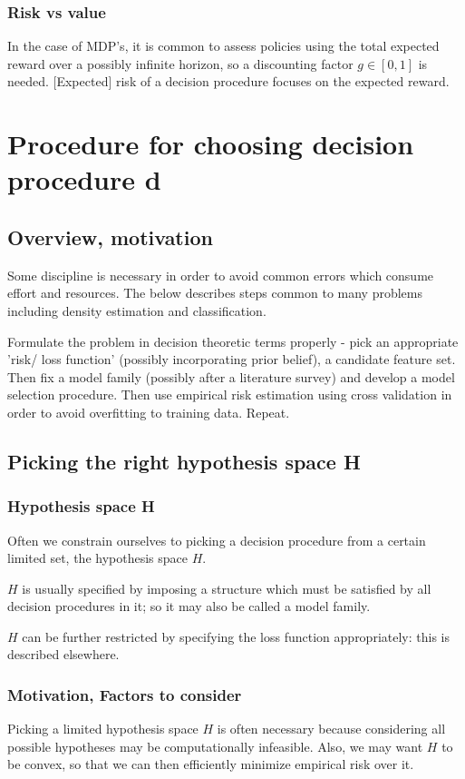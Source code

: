 \documentclass[oneside, article]{memoir}
\begin{document}
\subsection{Risk vs value}
In the case of MDP's, it is common to assess policies using the total expected reward over a possibly infinite horizon, so a discounting factor $g \in [0, 1]$ is needed. [Expected] risk of a decision procedure focuses on the expected reward.

\chapter{Procedure for choosing decision procedure d}
\section{Overview, motivation}
Some discipline is necessary in order to avoid common errors which consume effort and resources. The below describes steps common to many problems including density estimation and classification.

Formulate the problem in decision theoretic terms properly - pick an appropriate 'risk/ loss function' (possibly incorporating prior belief), a candidate feature set. Then fix a model family (possibly after a literature survey) and develop a model selection procedure. Then use empirical risk estimation using cross validation in order to avoid overfitting to training data. Repeat.

\section{Picking the right hypothesis space H}
\subsection{Hypothesis space H}
Often we constrain ourselves to picking a decision procedure from a certain limited set, the hypothesis space $H$.

$H$ is usually specified by imposing a structure which must be satisfied by all decision procedures in it; so it may also be called a model family.

$H$ can be further restricted by specifying the loss function appropriately: this is described elsewhere.

\subsection{Motivation, Factors to consider}
Picking a limited hypothesis space $H$ is often necessary because considering all possible hypotheses may be computationally infeasible. Also, we may want $H$ to be convex, so that we can then efficiently minimize empirical risk over it.
\end{document}
